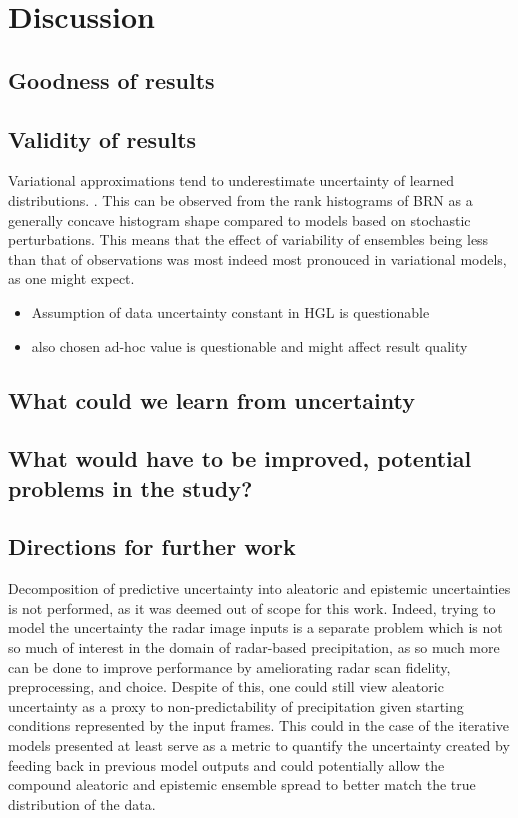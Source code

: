 \chapter{Discussion}
\label{chapter:discussion}

\section{Goodness of results}
\section{Validity of results}

Variational approximations tend to underestimate uncertainty of learned distributions. \cite{bishop2006pattern, minka_family_nodate}. This can be observed from the rank histograms of BRN as a generally concave histogram shape compared to models based on stochastic perturbations. This means that the effect of variability of ensembles being less than that of observations was most indeed most pronouced in variational models, as one might expect. 

\begin{itemize}
	\item Assumption of data uncertainty constant in HGL is questionable
	\item also chosen ad-hoc value is questionable and might affect result quality 
\end{itemize}
\section{What could we learn from uncertainty}

\section{What would have to be improved, potential problems in the study?}

\section{Directions for further work}

Decomposition of predictive uncertainty into aleatoric and epistemic uncertainties is not performed, as it was deemed out of scope for this work. Indeed, trying to model the uncertainty the radar image inputs is a separate problem which is not so much of interest in the domain of radar-based precipitation, as so much more can be done to improve performance by ameliorating radar scan fidelity, preprocessing, and choice. Despite of this, one could still view aleatoric uncertainty as a proxy to non-predictability of precipitation given starting conditions represented by the input frames. This could in the case of the iterative models presented at least serve as a metric to quantify the uncertainty created by feeding back in previous model outputs and could potentially allow the compound aleatoric and epistemic ensemble spread to better match the true distribution of the data. 


